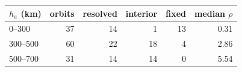 \begin{tabular}{@{}l r r r r r@{}}
\toprule
$h_a$ (km) & orbits & resolved & interior & fixed & median $\rho$ \\
\midrule
0--300 & 37 & 14 & 1 & 13 & 0.31 \\
300--500 & 60 & 22 & 18 & 4 & 2.86 \\
500--700 & 31 & 14 & 14 & 0 & 5.54 \\
\bottomrule
\end{tabular}

